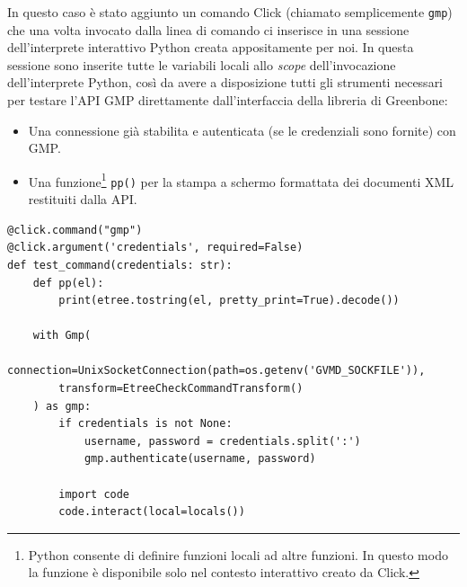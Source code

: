 In questo caso è stato aggiunto un comando Click (chiamato semplicemente \texttt{gmp}) che una volta invocato dalla linea di comando ci inserisce in una sessione dell'interprete interattivo Python creata appositamente per noi. In questa sessione sono inserite tutte le variabili locali allo \emph{scope} dell'invocazione dell'interprete Python, così da avere a disposizione tutti gli strumenti necessari per testare l'API GMP direttamente dall'interfaccia della libreria di Greenbone:
\begin{itemize}
    \item Una connessione già stabilita e autenticata (se le credenziali sono fornite) con GMP.
    \item Una funzione\footnote{Python consente di definire funzioni locali ad altre funzioni. In questo modo la funzione è disponibile solo nel contesto interattivo creato da Click.} \texttt{pp()} per la stampa a schermo formattata dei documenti XML restituiti dalla API.
\end{itemize}

\begin{verbatim}
@click.command("gmp")
@click.argument('credentials', required=False)
def test_command(credentials: str):
    def pp(el):
        print(etree.tostring(el, pretty_print=True).decode())

    with Gmp(
        connection=UnixSocketConnection(path=os.getenv('GVMD_SOCKFILE')),
        transform=EtreeCheckCommandTransform()
    ) as gmp:
        if credentials is not None:
            username, password = credentials.split(':')
            gmp.authenticate(username, password)

        import code
        code.interact(local=locals())
\end{verbatim}